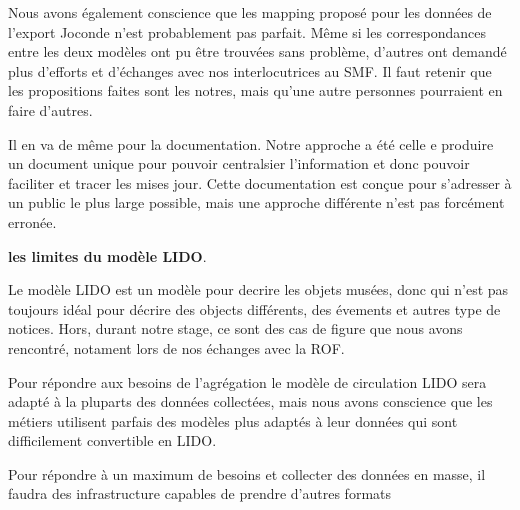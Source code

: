 Nous avons également conscience que les mapping proposé pour les données de l’export Joconde n’est probablement pas parfait. Même si les correspondances entre les deux modèles ont pu être trouvées sans problème, d'autres ont demandé plus d'efforts et d'échanges avec nos interlocutrices au SMF. Il faut retenir que les propositions faites sont les notres, mais qu'une autre personnes pourraient en faire d'autres.\newline

Il en va de même pour la documentation. Notre approche a été celle e produire un document unique pour pouvoir centralsier l'information et donc pouvoir faciliter et tracer les mises jour. Cette documentation est conçue pour s'adresser à un public le plus large possible, mais une approche différente n'est pas forcément erronée.\newline

\textbf{les limites du modèle LIDO}. \newline

Le modèle LIDO est un modèle pour decrire les objets
musées, donc qui n’est pas toujours idéal pour décrire des objects différents, des évements et autres type de notices. Hors, durant notre stage, ce sont des cas de figure que nous avons rencontré, notament lors de nos échanges avec la ROF.\newline

Pour répondre aux besoins de l'agrégation le modèle de circulation LIDO sera adapté à la pluparts des données collectées, mais nous avons conscience que les métiers utilisent parfais des modèles plus adaptés à leur données qui sont difficilement convertible en LIDO.\newline

Pour répondre à un maximum de besoins et collecter des données en masse, il faudra des infrastructure capables de prendre d'autres formats
